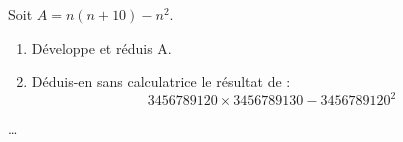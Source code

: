 \begin{exercice*}
    Soit $A = n(n + 10) - n^2$.
    \begin{enumerate}
        \item Développe et réduis A.
        \item Déduis-en sans calculatrice le résultat de : 
        \[\num{3456789120} \times \num{3456789130} - \num{3456789120}^2\]
    \end{enumerate}
\end{exercice*}
\begin{corrige}
    \dots
\end{corrige}

